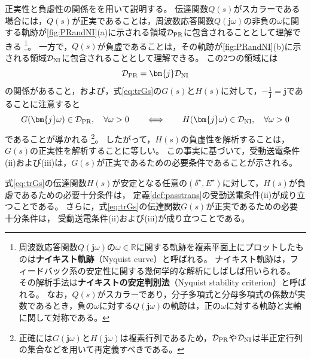 \documentclass[tombow,dvipdfmx]{corona-a5-1.1}
\begin{document}
正実性と負虚性の関係をを用いて説明する。
伝達関数$Q(s)$がスカラーである場合には，$Q(s)$が正実であることは，周波数応答関数$Q(\bm{j} \omega)$の非負の$\omega$に関する軌跡が\ref{fig:PRandNI}(a)に示される領域$\mathcal{D}_{\rm PR}$に包含されることとして理解できる
\footnote{
周波数応答関数$Q(\bm{j} \omega)$の$\omega \in \mathbb{R}$に関する軌跡を複素平面上にプロットしたものは\textbf{ナイキスト軌跡}（Nyquist curve）と呼ばれる。
ナイキスト軌跡は，フィードバック系の安定性に関する幾何学的な解析にしばしば用いられる。
その解析手法は\textbf{ナイキストの安定判別法}（Nyquist stability criterion）と呼ばれる。
なお，$Q(s)$がスカラーであり，分子多項式と分母多項式の係数が実数であるとき，負の$\omega$に対する$Q(\bm{j} \omega)$の軌跡は，正の$\omega$に対する軌跡と実軸に関して対称である。
}。
一方で，$Q(s)$が負虚であることは，その軌跡が\ref{fig:PRandNI}(b)に示される領域$\mathcal{D}_{\rm NI}$に包含されることとして理解できる。
この2つの領域には
\[
\mathcal{D}_{\rm PR} = \bm{j} \mathcal{D}_{\rm NI}
\]
の関係があること，および，式\ref{eq:trGs}の$G(s)$と$H(s)$に対して，$-\tfrac{1}{\bm{j}}=\bm{j}$であることに注意すると
\[
G(\bm{j} \omega) \in \mathcal{D}_{\rm PR}, 
\quad \forall \omega >0
\qquad
\Longleftrightarrow
\qquad
H(\bm{j} \omega) \in \mathcal{D}_{\rm NI} ,
\quad \forall \omega >0
\]
であることが導かれる
\footnote{
正確には$G(\bm{j} \omega)$と$H(\bm{j} \omega)$は複素行列であるため，$\mathcal{D}_{\rm PR}$や$\mathcal{D}_{\rm NI}$は半正定行列の集合などを用いて再定義すべきである。
}。
したがって，$H(s)$の負虚性を解析することは，$G(s)$の正実性を解析することに等しい。
この事実に基づいて，受動送電条件(ii)および(iii)は，$G(s)$が正実であるための必要条件であることが示される。

\begin{定理}[電気サブシステムの伝達関数の正実性]
\label{thm:EdynNI}
式\ref{eq:trGs}の伝達関数$H(s)$が安定となる任意の$(\delta^{\star},E^{\star})$に対して，$H(s)$が負虚であるための必要十分条件は，
定義\ref{def:passtrans}の受動送電条件(ii)が成り立つことである。
さらに，式\ref{eq:trGs}の伝達関数$G(s)$が正実であるための必要十分条件は，
受動送電条件(ii)および(iii)が成り立つことである。
\end{定理}
\end{document}
